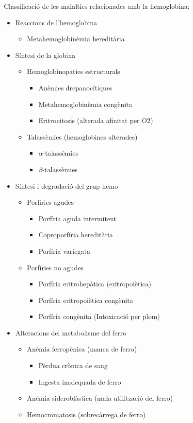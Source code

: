 Classificació de les malalties relacionades amb la hemoglobina:
\begin{itemize}
\item Reaccions de l'hemoglobina
  \begin{itemize}
  \item Metahemoglobinèmia hereditària
  \end{itemize}

\item Síntesi de la globina
  \begin{itemize}
  \item Hemoglobinopaties estructurals
    \begin{itemize}
    \item Anèmies drepanocítiques 
    \item Metahemoglobinèmia congènita
    \item Eritrocitosis (alterada afinitat per O2)
    \end{itemize}
  \item Talassèmies (hemoglobines alterades)
    \begin{itemize}
    \item  $\alpha$-talassèmies
    \item $\beta$-talassèmies
    \end{itemize}
  \end{itemize}

\item Síntesi i degradació del grup hemo
  \begin{itemize}
  \item Porfiries agudes
    \begin{itemize}
    \item Porfíria aguda intermitent 
    \item Coproporfíria hereditària
    \item Porfíria variegata
   \end{itemize}
  \item Porfíries no agudes
    \begin{itemize}
    \item Porfíria eritrohepàtica (eritropoiètica) 
    \item Porfíria eritropoiètica congènita
    \item Porfíria congènita (Intoxicació per plom)
    \end{itemize}
  \end{itemize}

\item Alteracions del metabolisme del ferro
  \begin{itemize}
  \item Anèmia ferropènica (manca de ferro)
    \begin{itemize}
    \item Pèrdua crònica de sang
    \item Ingesta inadequada de ferro
    \end{itemize}
  \item Anèmia sideroblàstica (mala utilització del ferro)
  \item Hemocromatosis (sobrecàrrega de ferro)
  \end{itemize}
\end{itemize}

